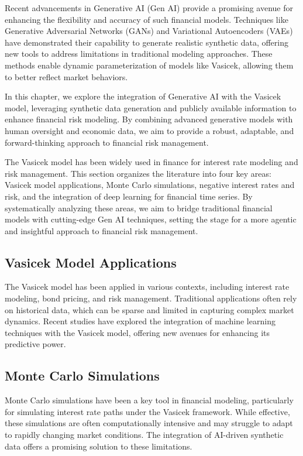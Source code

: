 \documentclass[a4paper,headinclude=on,footinclude=on,12pt,oneside]{scrbook}
\begin{document}
	Recent advancements in Generative AI (Gen AI) provide a promising avenue for enhancing the flexibility and accuracy of such financial models. Techniques like Generative Adversarial Networks (GANs) and Variational Autoencoders (VAEs) have demonstrated their capability to generate realistic synthetic data, offering new tools to address limitations in traditional modeling approaches. These methods enable dynamic parameterization of models like Vasicek, allowing them to better reflect market behaviors.
	
	In this chapter, we explore the integration of Generative AI with the Vasicek model, leveraging synthetic data generation and publicly available information to enhance financial risk modeling. By combining advanced generative models with human oversight and economic data, we aim to provide a robust, adaptable, and forward-thinking approach to financial risk management.
	
	
	The Vasicek model has been widely used in finance for interest rate modeling and risk management. This section organizes the literature into four key areas: Vasicek model applications, Monte Carlo simulations, negative interest rates and risk, and the integration of deep learning for financial time series. By systematically analyzing these areas, we aim to bridge traditional financial models with cutting-edge Gen AI techniques, setting the stage for a more agentic and insightful approach to financial risk management.
	
	\subsection{Vasicek Model Applications}
	
	The Vasicek model has been applied in various contexts, including interest rate modeling, bond pricing, and risk management. Traditional applications often rely on historical data, which can be sparse and limited in capturing complex market dynamics. Recent studies have explored the integration of machine learning techniques with the Vasicek model, offering new avenues for enhancing its predictive power.
	
	\subsection{Monte Carlo Simulations}
	
	Monte Carlo simulations have been a key tool in financial modeling, particularly for simulating interest rate paths under the Vasicek framework. While effective, these simulations are often computationally intensive and may struggle to adapt to rapidly changing market conditions. The integration of AI-driven synthetic data offers a promising solution to these limitations.
	
\end{document}
